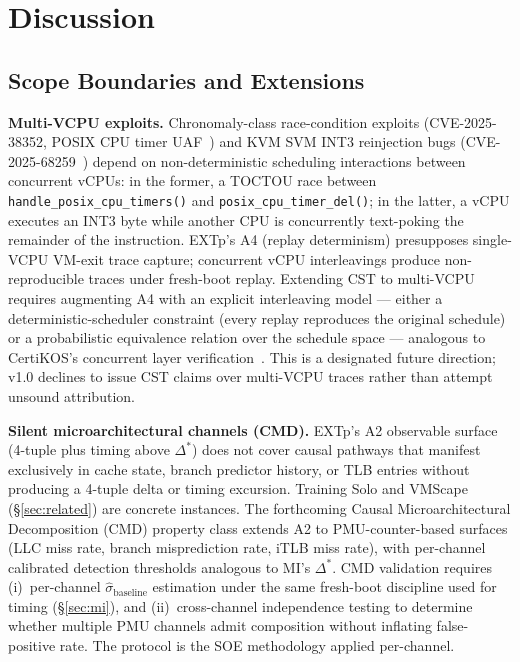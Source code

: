 \documentclass[conference]{IEEEtran}
\newcommand{\sigbase}{\hat{\sigma}_\text{baseline}}
\newcommand{\Dstar}{\Delta^{*}}
\begin{document}
\section{Discussion}\label{sec:discussion}

\subsection{Scope Boundaries and Extensions}\label{sec:discussion-scope}

\textbf{Multi-VCPU exploits.} Chronomaly-class race-condition
exploits (CVE-2025-38352, POSIX CPU timer
UAF~\cite{linuxkernel2025chronomaly}) and KVM SVM INT3 reinjection
bugs (CVE-2025-68259~\cite{linuxkernel2025int3reinject}) depend on
non-deterministic scheduling interactions between concurrent vCPUs:
in the former, a TOCTOU race between
\texttt{handle\_posix\_cpu\_timers()} and
\texttt{posix\_cpu\_timer\_del()}; in the latter, a vCPU executes
an INT3 byte while another CPU is concurrently text-poking the
remainder of the instruction. EXTp's A4 (replay determinism)
presupposes single-VCPU VM-exit trace capture; concurrent vCPU
interleavings produce non-reproducible traces under fresh-boot
replay. Extending CST to multi-VCPU requires augmenting A4 with an
explicit interleaving model --- either a deterministic-scheduler
constraint (every replay reproduces the original schedule) or a
probabilistic equivalence relation over the schedule space ---
analogous to CertiKOS's concurrent layer
verification~\cite{gu2016certikos}. This is a designated future
direction; v1.0 declines to issue CST claims over multi-VCPU
traces rather than attempt unsound attribution.

\textbf{Silent microarchitectural channels (CMD).} EXTp's A2
observable surface (4-tuple plus timing above $\Dstar$) does not
cover causal pathways that manifest exclusively in cache state,
branch predictor history, or TLB entries without producing a
4-tuple delta or timing excursion. Training Solo and VMScape
(\S\ref{sec:related}) are concrete instances. The forthcoming
Causal Microarchitectural Decomposition (CMD) property class
extends A2 to PMU-counter-based surfaces (LLC miss rate, branch
misprediction rate, iTLB miss rate), with per-channel calibrated
detection thresholds analogous to MI's $\Dstar$. CMD validation
requires (i)~per-channel $\sigbase$ estimation under the same
fresh-boot discipline used for timing (\S\ref{sec:mi}), and
(ii)~cross-channel independence testing to determine whether
multiple PMU channels admit composition without inflating
false-positive rate. The protocol is the SOE methodology applied
per-channel.
\end{document}
